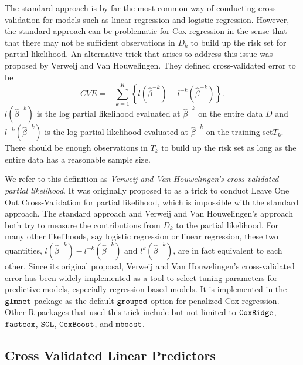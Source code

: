 \par The standard approach is by far the most common way of conducting cross-validation for models such as linear regression and logistic regression. However, the standard approach can be problematic for Cox regression in the sense that that there may not be sufficient observations in $D_k$ to build up the risk set for partial likelihood. An alternative trick that arises to address this issue was proposed by Verweij and Van Houwelingen. They defined cross-validated error to be 
\begin{equation}
\label{eq:VVH}
	CVE = -\sum_{k = 1}^K \left\{ l(\hat{\beta}^{- k})  - l^{-k}(\hat{\beta}^{- k}) \right\}. 
\end{equation}
$l(\hat{\beta}^{-k})$ is the log partial likelihood evaluated at $\hat{\beta}^{-k}$ on the entire data $D$ and $l^{-k}(\hat{\beta}^{-k})$ is the log partial likelihood evaluated at $\hat{\beta}^{-k}$ on the training set$T_k$. There should be enough observations in $T_k$ to build up the risk set as long as the entire data has a reasonable sample size. 

\par We refer to this definition as \emph{Verweij and Van Houwelingen's cross-validated partial likelihood}. It was originally proposed to as a trick to conduct Leave One Out Cross-Validation for partial likelihood, which is impossible with the standard approach. The standard approach and Verweij and Van Houwelingen's approach both try to measure the contributions from $D_k$ to the partial likelihood. For many other likelihoods, say logistic regression or linear regression, these two quantities, $l(\hat{\beta}^{- k})  - l^{-k}(\hat{\beta}^{- k})$ and  $l^{k}(\hat{\beta}^{-k})$, are in fact equivalent to each other. Since its original proposal, Verweij and Van Houwelingen's cross-validated error has been widely implemented as a tool to select tuning parameters for predictive models, especially regression-based models. It is implemented in the $\tt{glmnet}$ package as the default $\tt{grouped}$ option for penalized Cox regression. Other R packages that used this trick include but not limited to $\tt{CoxRidge}$, $\tt{fastcox}$, $\tt{SGL}$, $\tt{CoxBoost}$, and $\tt{mboost}$. 

  \subsection{Cross Validated Linear Predictors}

